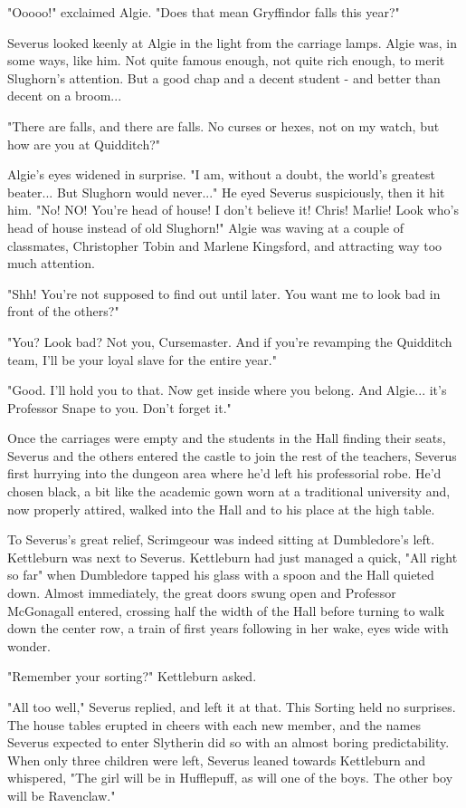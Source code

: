 "Ooooo!" exclaimed Algie. "Does that mean Gryffindor falls this year?"

Severus looked keenly at Algie in the light from the carriage lamps. Algie was, in some ways, like him. Not quite famous enough, not quite rich enough, to merit Slughorn's attention. But a good chap and a decent student - and better than decent on a broom...

"There are falls, and there are falls. No curses or hexes, not on my watch, but how are you at Quidditch?"

Algie's eyes widened in surprise. "I am, without a doubt, the world's greatest beater... But Slughorn would never..." He eyed Severus suspiciously, then it hit him. "No! NO! You're head of house! I don't believe it! Chris! Marlie! Look who's head of house instead of old Slughorn!" Algie was waving at a couple of classmates, Christopher Tobin and Marlene Kingsford, and attracting way too much attention.

"Shh! You're not supposed to find out until later. You want me to look bad in front of the others?"

"You? Look bad? Not you, Cursemaster. And if you're revamping the Quidditch team, I'll be your loyal slave for the entire year."

"Good. I'll hold you to that. Now get inside where you belong. And Algie... it's Professor Snape to you. Don't forget it."

Once the carriages were empty and the students in the Hall finding their seats, Severus and the others entered the castle to join the rest of the teachers, Severus first hurrying into the dungeon area where he'd left his professorial robe. He'd chosen black, a bit like the academic gown worn at a traditional university and, now properly attired, walked into the Hall and to his place at the high table.

To Severus's great relief, Scrimgeour was indeed sitting at Dumbledore's left. Kettleburn was next to Severus. Kettleburn had just managed a quick, "All right so far" when Dumbledore tapped his glass with a spoon and the Hall quieted down. Almost immediately, the great doors swung open and Professor McGonagall entered, crossing half the width of the Hall before turning to walk down the center row, a train of first years following in her wake, eyes wide with wonder.

"Remember your sorting?" Kettleburn asked.

"All too well," Severus replied, and left it at that. This Sorting held no surprises. The house tables erupted in cheers with each new member, and the names Severus expected to enter Slytherin did so with an almost boring predictability. When only three children were left, Severus leaned towards Kettleburn and whispered, "The girl will be in Hufflepuff, as will one of the boys. The other boy will be Ravenclaw."

